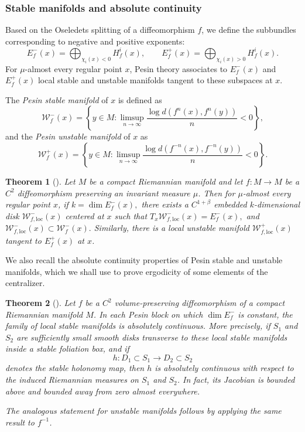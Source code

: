 \documentclass[11pt]{amsart}
\numberwithin{equation}{section}
\theoremstyle{plain}
\newtheorem{thm}{Theorem}[section]
\begin{document}
\subsubsection{Stable manifolds and absolute continuity}\mbox{}\par

Based on the Oseledets splitting of a diffeomorphism $f$, we define the subbundles corresponding to negative and positive exponents:
\[
E^-_f(x)=\bigoplus_{\chi_i(x)<0} H^i_f(x), \qquad
E^+_f(x)=\bigoplus_{\chi_i(x)>0} H^i_f(x).
\]
For $\mu$-almost every regular point $x$, Pesin theory associates to
$E^-_f(x)$ and $E^+_f(x)$ local stable and unstable manifolds tangent
to these subspaces at $x$.

The \emph{Pesin stable manifold} of $x$ is defined as
\[
\mathcal{W}^-_f(x)=\left\{y\in M : \limsup_{n\to \infty}\frac{\log d(f^n(x),f^n(y))}{n}<0\right\},
\]
and the \emph{Pesin unstable manifold} of $x$ as
\[
\mathcal{W}^+_f(x)=\left\{y\in M : \limsup_{n\to \infty}\frac{\log d(f^{-n}(x),f^{-n}(y))}{n}<0\right\}.
\]


\begin{thm}[{\cite[Theorem~7.1 and Section~7.3.5]{introdyn}}]\label{pesin}
Let $M$ be a compact Riemannian manifold and let $f:M\to M$ be a $C^2$
diffeomorphism preserving an invariant measure $\mu$. Then for
$\mu$-almost every regular point $x$, if
$
k=\dim E^-_f(x),$ 
there exists a $C^{1+\beta}$ embedded $k$-dimensional disk
$\mathcal{W}^-_{f,\mathrm{loc}}(x)$ centered at $x$ such that
$
T_x\mathcal{W}^-_{f,\mathrm{loc}}(x)=E^-_f(x),
$
and
$
\mathcal{W}^-_{f,\mathrm{loc}}(x)\subset \mathcal{W}^-_f(x).
$
Similarly, there is a local unstable manifold
$\mathcal{W}^+_{f,\mathrm{loc}}(x)$ tangent to $E^+_f(x)$ at $x$.
\end{thm}


We also recall the absolute continuity properties of Pesin stable and unstable manifolds, which we shall use to prove ergodicity of some elements of the centralizer.


\begin{thm}[{\cite[Theorem~8.2 and Remark~8.19]{introdyn}}]\label{pesabcont}
Let $f$ be a $C^2$ volume-preserving diffeomorphism of a compact
Riemannian manifold $M$. In each Pesin block on which
$\dim E^-_f$ is constant, the family of local stable manifolds is
absolutely continuous. More precisely, if $S_1$ and $S_2$ are
sufficiently small smooth disks transverse to these local stable
manifolds inside a stable foliation box, and if
\[
h:D_1\subset S_1\longrightarrow D_2\subset S_2
\]
denotes the stable holonomy map, then $h$ is absolutely continuous with
respect to the induced Riemannian measures on $S_1$ and $S_2$. In fact,
its Jacobian is bounded above and bounded away from zero almost
everywhere.

The analogous statement for unstable manifolds follows by applying the
same result to $f^{-1}$.
\end{thm}
\end{document}

